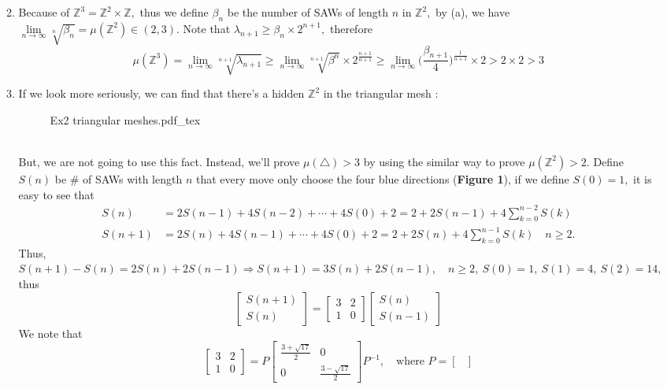 \documentclass[12pt,a4paper]{article}
\newcommand{\incfig}[1]{%
{#1.pdf_tex}
}
\begin{document}
\begin{enumerate}
\begin{enumerate}
\[		\]
		\item Because of $\mathbb{Z}^3=\mathbb{Z}^2\times \mathbb{Z},$ thus we define $\beta_n$ be the number of SAWs of length $n$ in $\mathbb{Z}^2,$ by (a), we have $\lim\limits_{n\to\infty}\sqrt[n]{\beta_n}=\mu(\mathbb{Z}^2)\in(2,3).$ Note that $\lambda_{n+1}\geq \beta_n\times 2^{n+1},$ therefore 
		\[
		\mu(\mathbb{Z}^3)=\lim_{n\to\infty}\sqrt[n+1]{\lambda_{n+1}}\geq \lim_{n\to\infty}\sqrt[n+1]{\beta^n}\times 2^{\frac{n+1}{n+1}}\geq \lim_{n\to\infty}\Big(\frac{\beta_{n+1}}{4}\Big)^{\frac{1}{n+1}}\times 2>2\times 2>3
		\]
		\item If we look more seriously, we can find that there's a hidden $\mathbb{Z}^2$ in the triangular mesh :
		\begin{figure}[htp]
		\centering
		\def\svgwidth{6cm}
		\incfig{Ex2 triangular meshes}
		\end{figure}
		\\
		But, we are not going to use this fact. Instead, we'll prove $\mu(\triangle)>3$ by using the similar way to prove $\mu(\mathbb{Z}^2)>2.$ Define $S(n)$ be \# of SAWs with length $n$ that every move only choose the four blue directions (\textbf{Figure 1}), if we define $S(0)=1,$ it is easy to see that 
		\begin{align*}
		S(n)&=2S(n-1)+4S(n-2)+\cdots +4S(0)+2=2+2S(n-1)+4\sum_{k=0}^{n-2}S(k)\\
		S(n+1)&=2S(n)+4S(n-1)+\cdots +4S(0)+2=2+2S(n)+4\sum_{k=0}^{n-1}S(k)\quad n\geq 2.
		\end{align*}
		\newpage
		Thus, $S(n+1)-S(n)=2S(n)+2S(n-1)\Rightarrow S(n+1)=3S(n)+2S(n-1),\quad n\geq 2,\ S(0)=1,\ S(1)=4,\ S(2)=14,$ thus
		\[
		\begin{bmatrix}
		S(n+1)\\
		S(n)
		\end{bmatrix}=\begin{bmatrix}
		3 & 2\\
		1 & 0
		\end{bmatrix}\begin{bmatrix}
		S(n)\\
		S(n-1)
		\end{bmatrix}
		\]
		We note that 
		\[
		\begin{bmatrix}
		3 & 2\\
		1 & 0
		\end{bmatrix}=P\begin{bmatrix}
		\frac{3+\sqrt{17}}{2} & 0\\
		0 & \frac{3-\sqrt{17}}{2}
		\end{bmatrix}P^{-1},\quad\mbox{where }P=\begin{bmatrix}

\end{bmatrix}\]
\end{enumerate}
\end{enumerate}
\end{document}
